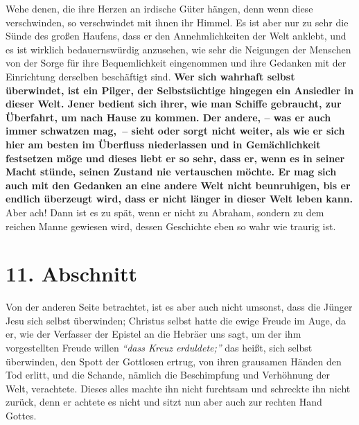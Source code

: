 \label{ref:04_10_pilger}
 Wehe denen, die ihre Herzen an irdische Güter hängen, denn
wenn diese
verschwinden, so verschwindet mit ihnen ihr Himmel. Es ist
aber nur zu sehr die
Sünde des großen Haufens, dass er den Annehmlichkeiten der Welt anklebt, und es
ist wirklich bedauernswürdig anzusehen, wie sehr die Neigungen der Menschen von
der Sorge für ihre Bequemlichkeit eingenommen und ihre Gedanken mit der
Einrichtung derselben beschäftigt sind. \textbf{Wer sich wahrhaft selbst
überwindet, ist
ein Pilger, der Selbstsüchtige hingegen ein Ansiedler
in dieser
Welt. Jener
bedient sich ihrer, wie man Schiffe gebraucht, zur Überfahrt, um nach Hause zu
kommen. Der andere, -- was er auch immer schwatzen mag,~-- sieht oder sorgt
nicht weiter, als wie er sich hier am besten im Überfluss niederlassen und in
Gemächlichkeit festsetzen möge und dieses liebt er so sehr, dass er, wenn es in
seiner Macht stünde, seinen Zustand nie vertauschen möchte. Er mag sich auch mit
den Gedanken an eine andere Welt nicht beunruhigen, bis er endlich überzeugt
wird, dass er nicht länger in dieser Welt leben kann.} Aber ach! Dann ist es zu
spät, wenn er nicht zu Abraham, sondern zu dem reichen Manne gewiesen wird,
dessen Geschichte eben so wahr wie traurig ist.

\section{11. Abschnitt} \label{kap4_ab11}


Von der anderen Seite betrachtet, ist es aber auch nicht umsonst, dass die
Jünger
Jesu sich selbst überwinden; Christus selbst hatte die ewige Freude im Auge, da er,
wie der Verfasser der Epistel an die Hebräer uns sagt, um der ihm vorgestellten
Freude willen
\textit{"`dass Kreuz erduldete;"'}
das heißt, sich
selbst überwinden,
den
Spott der Gottlosen ertrug, von ihren grausamen Händen
den Tod erlitt, und die Schande, nämlich die Beschimpfung und Verhöhnung der
Welt, verachtete. Dieses alles machte ihn nicht furchtsam und schreckte ihn
nicht zurück, denn er achtete es nicht und sitzt nun aber auch zur rechten Hand
Gottes.

\medskip

